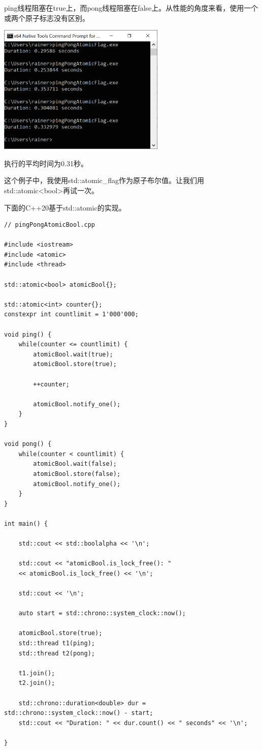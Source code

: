 ping线程阻塞在true上，而pong线程阻塞在false上。从性能的角度来看，使用一个或两个原子标志没有区别。

\begin{center}
\includegraphics[width=0.6\textwidth]{content/3/chapter7/images/4.png}\\
\end{center}

执行的平均时间为0.31秒。

这个例子中，我使用std::atomic\_flag作为原子布尔值。让我们用std::atomic<bool>再试一次。


下面的C++20基于std::atomic的实现。

\begin{lstlisting}[style=styleCXX]
// pingPongAtomicBool.cpp

#include <iostream>
#include <atomic>
#include <thread>

std::atomic<bool> atomicBool{};

std::atomic<int> counter{};
constexpr int countlimit = 1'000'000;

void ping() {
	while(counter <= countlimit) {
		atomicBool.wait(true);
		atomicBool.store(true);
		
		++counter;
		
		atomicBool.notify_one();
	}
}

void pong() {
	while(counter < countlimit) {
		atomicBool.wait(false);
		atomicBool.store(false);
		atomicBool.notify_one();
	}
}

int main() {

	std::cout << std::boolalpha << '\n';
	
	std::cout << "atomicBool.is_lock_free(): "
	<< atomicBool.is_lock_free() << '\n';
	
	std::cout << '\n';
	
	auto start = std::chrono::system_clock::now();
	
	atomicBool.store(true);
	std::thread t1(ping);
	std::thread t2(pong);
	
	t1.join();
	t2.join();
	
	std::chrono::duration<double> dur = std::chrono::system_clock::now() - start;
	std::cout << "Duration: " << dur.count() << " seconds" << '\n';

}
\end{lstlisting}

